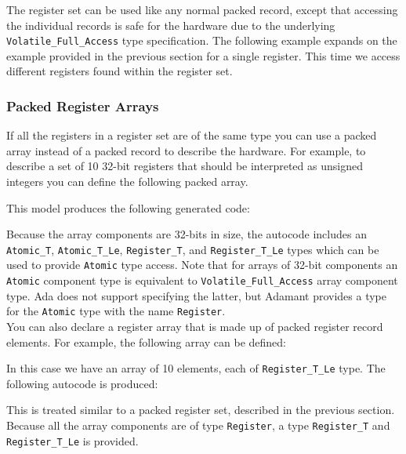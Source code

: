 The register set can be used like any normal packed record, except that accessing the individual records is safe for the hardware due to the underlying \texttt{Volatile\_Full\_Access} type specification. The following example expands on the example provided in the previous section for a single register. This time we access different registers found within the register set.


\subsubsection{Packed Register Arrays}

If all the registers in a register set are of the same type you can use a packed array instead of a packed record to describe the hardware. For example, to describe a set of 10 32-bit registers that should be interpreted as unsigned integers you can define the following packed array.


This model produces the following generated code:


Because the array components are 32-bits in size, the autocode includes an \texttt{Atomic\_T}, \texttt{Atomic\_T\_Le}, \texttt{Register\_T}, and \texttt{Register\_T\_Le} types which can be used to provide \texttt{Atomic} type access. Note that for arrays of 32-bit components an \texttt{Atomic} component type is equivalent to \texttt{Volatile\_Full\_Access} array component type. Ada does not support specifying the latter, but Adamant provides a type for the \texttt{Atomic} type with the name \texttt{Register}. \\

You can also declare a register array that is made up of packed register record elements. For example, the following array can be defined:


In this case we have an array of 10 elements, each of \texttt{Register\_T\_Le} type. The following autocode is produced:


This is treated similar to a packed register set, described in the previous section. Because all the array components are of type \texttt{Register}, a type \texttt{Register\_T} and \texttt{Register\_T\_Le} is provided. \\

